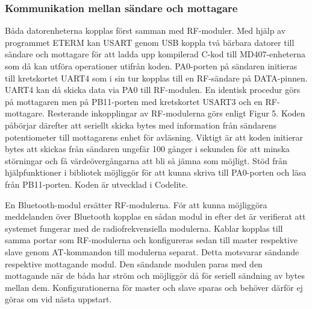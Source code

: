 \documentclass[a4paper]{article}
\begin{document}
\subsubsection{Kommunikation mellan sändare och mottagare}
Båda datorenheterna kopplas först samman med RF-moduler. Med hjälp av programmet ETERM kan USART genom USB koppla två bärbara datorer till sändare och mottagare för att ladda upp kompilerad C-kod till MD407-enheterna som då kan utföra operationer utifrån koden. PA0-porten på sändaren initieras till kretskortet UART4 som i sin tur kopplas till en RF-sändare på DATA-pinnen. UART4 kan då skicka data via PA0 till RF-modulen. En identisk procedur görs på mottagaren men på PB11-porten med kretskortet USART3 och en RF-mottagare. Resterande inkopplingar av RF-modulerna görs enligt Figur 5. Koden påbörjar därefter att seriellt skicka bytes med information från sändarens potentiometer till mottagarens enhet för avläsning. Viktigt är att koden initierar bytes att skickas från sändaren ungefär 100 gånger i sekunden för att minska störningar och få värdeövergångarna att bli så jämna som möjligt. Stöd från hjälpfunktioner i bibliotek möjliggör för att kunna skriva till PA0-porten och läsa från PB11-porten. Koden är utvecklad i Codelite.

\vspace{5mm} \noindent
En Bluetooth-modul ersätter RF-modulerna. För att kunna möjliggöra meddelanden över Bluetooth kopplas en sådan modul in efter det är verifierat att systemet fungerar med de radiofrekvensiella modulerna. Kablar kopplas till samma portar som RF-modulerna och konfigureras sedan till master respektive slave genom AT-kommandon till modulerna separat. Detta motsvarar sändande respektive mottagande modul. Den sändande modulen paras med den mottagande när de båda har ström och möjliggör då för seriell sändning av bytes mellan dem. Konfigurationerna för master och slave sparas och behöver därför ej göras om vid nästa uppstart.
\end{document}
